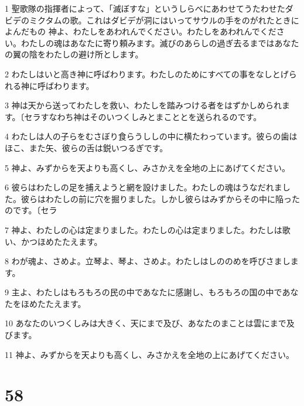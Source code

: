 \par 1 聖歌隊の指揮者によって、「滅ぼすな」というしらべにあわせてうたわせたダビデのミクタムの歌。これはダビデが洞にはいってサウルの手をのがれたときによんだもの 神よ、わたしをあわれんでください。わたしをあわれんでください。わたしの魂はあなたに寄り頼みます。滅びのあらしの過ぎ去るまではあなたの翼の陰をわたしの避け所とします。
\par 2 わたしはいと高き神に呼ばわります。わたしのためにすべての事をなしとげられる神に呼ばわります。
\par 3 神は天から送ってわたしを救い、わたしを踏みつける者をはずかしめられます。〔セラすなわち神はそのいつくしみとまこととを送られるのです。
\par 4 わたしは人の子らをむさぼり食らうししの中に横たわっています。彼らの歯はほこ、また矢、彼らの舌は鋭いつるぎです。
\par 5 神よ、みずからを天よりも高くし、みさかえを全地の上にあげてください。
\par 6 彼らはわたしの足を捕えようと網を設けました。わたしの魂はうなだれました。彼らはわたしの前に穴を掘りました。しかし彼らはみずからその中に陥ったのです。〔セラ
\par 7 神よ、わたしの心は定まりました。わたしの心は定まりました。わたしは歌い、かつほめたたえます。
\par 8 わが魂よ、さめよ。立琴よ、琴よ、さめよ。わたしはしののめを呼びさまします。
\par 9 主よ、わたしはもろもろの民の中であなたに感謝し、もろもろの国の中であなたをほめたたえます。
\par 10 あなたのいつくしみは大きく、天にまで及び、あなたのまことは雲にまで及びます。
\par 11 神よ、みずからを天よりも高くし、みさかえを全地の上にあげてください。

\chapter{58}

